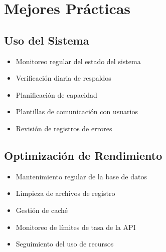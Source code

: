\section{Mejores Prácticas}

\subsection{Uso del Sistema}
\begin{itemize}
    \item Monitoreo regular del estado del sistema
    \item Verificación diaria de respaldos
    \item Planificación de capacidad
    \item Plantillas de comunicación con usuarios
    \item Revisión de registros de errores
\end{itemize}

\subsection{Optimización de Rendimiento}
\begin{itemize}
    \item Mantenimiento regular de la base de datos
    \item Limpieza de archivos de registro
    \item Gestión de caché
    \item Monitoreo de límites de tasa de la API
    \item Seguimiento del uso de recursos
\end{itemize} 